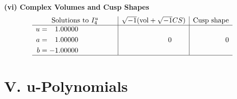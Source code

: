 \documentclass[1p]{elsarticle_modified}
\theoremstyle{definition}
\newcommand{\I}{\sqrt{-1}}
\begin{document}
\newpage\flushleft \textbf{(vi) Complex Volumes and Cusp Shapes}
$$\begin{array}{c|c|c}  
\text{Solutions to }I^u_{4}& \I (\text{vol} + \sqrt{-1}CS) & \text{Cusp shape}\\
 \hline 
\begin{aligned}
u &= \phantom{-}1.00000\phantom{ +0.000000I} \\
a &= \phantom{-}1.00000\phantom{ +0.000000I} \\
b &= -1.00000\phantom{ +0.000000I}\end{aligned}
 & \phantom{-0.000000 } 0 & \phantom{-0.000000 } 0\\
 \hline 
 \end{array}$$\newpage
\newpage\renewcommand{\arraystretch}{1}
\centering \section*{ V. u-Polynomials}
\end{document}

